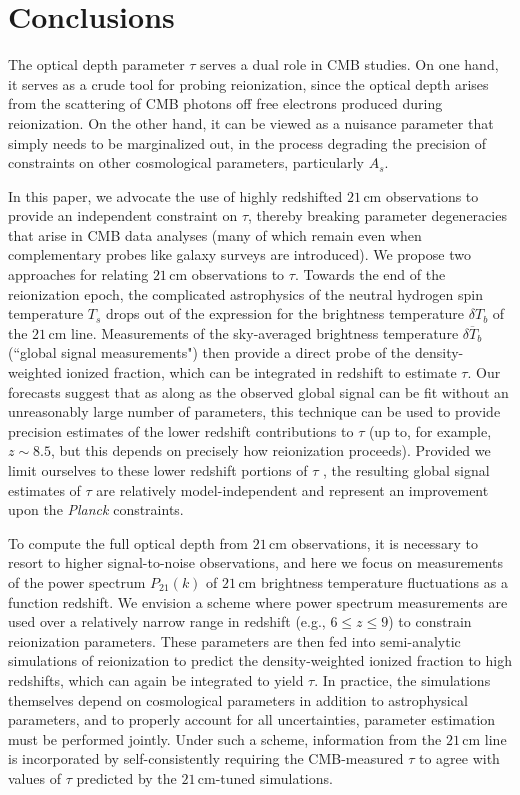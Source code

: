 \documentclass[twocolumn,aps,prd,nofootinbib,showpacs]{revtex4-1}
\begin{document}
\section{Conclusions}
\label{sec:conc}

The optical depth parameter $\tau$ serves a dual role in CMB studies. On one hand, it serves as a crude tool for probing reionization, since the optical depth arises from the scattering of CMB photons off free electrons produced during reionization. On the other hand, it can be viewed as a nuisance parameter that simply needs to be marginalized out, in the process degrading the precision of constraints on other cosmological parameters, particularly $A_s$.

In this paper, we advocate the use of highly redshifted $21\,\textrm{cm}$ observations to provide an independent constraint on $\tau$, thereby breaking parameter degeneracies that arise in CMB data analyses (many of which remain even when complementary probes like galaxy surveys are introduced). We propose two approaches for relating $21\,\textrm{cm}$ observations to $\tau$. Towards the end of the reionization epoch, the complicated astrophysics of the neutral hydrogen spin temperature $T_s$ drops out of the expression for the brightness temperature $\delta T_b$ of the $21\,\textrm{cm}$ line. Measurements of the sky-averaged brightness temperature $\overline{\delta T_b}$ (``global signal measurements") then provide a direct probe of the density-weighted ionized fraction, which can be integrated in redshift to estimate $\tau$. Our forecasts suggest that as along as the observed global signal can be fit without an unreasonably large number of parameters, this technique can be used to provide precision estimates of the lower redshift contributions to $\tau$ (up to, for example, $z \sim 8.5$, but this depends on precisely how reionization proceeds). Provided we limit ourselves to these lower redshift portions of $\tau$
, the resulting global signal estimates of $\tau$ are relatively model-independent and represent an improvement upon the \emph{Planck} constraints.

To compute the full optical depth from $21\,\textrm{cm}$ observations, it is necessary to resort to higher signal-to-noise observations, and here we focus on measurements of the power spectrum $P_{21} (k)$ of $21\,\textrm{cm}$ brightness temperature fluctuations as a function redshift. We envision a scheme where power spectrum measurements are used over a relatively narrow range in redshift (e.g., $6 \le z \le 9$) to constrain reionization parameters. These parameters are then fed into semi-analytic simulations of reionization to predict the density-weighted ionized fraction to high redshifts, which can again be integrated to yield $\tau$. In practice, the simulations themselves depend on cosmological parameters in addition to astrophysical parameters, and to properly account for all uncertainties, parameter estimation must be performed jointly. Under such a scheme, information from the $21\,\textrm{cm}$ line is incorporated by self-consistently requiring the CMB-measured $\tau$ to agree with values of $\tau$ predicted by the $21\,\textrm{cm}$-tuned simulations.
\end{document}
